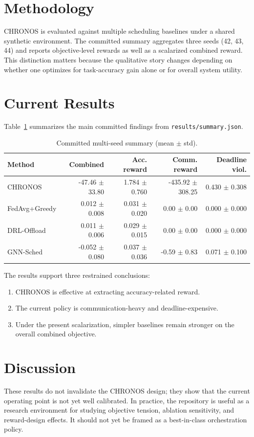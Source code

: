 \documentclass[conference]{IEEEtran}
\begin{document}
\section{Methodology}
CHRONOS is evaluated against multiple scheduling baselines under a shared synthetic environment. The committed summary aggregates three seeds (42, 43, 44) and reports objective-level rewards as well as a scalarized combined reward. This distinction matters because the qualitative story changes depending on whether one optimizes for task-accuracy gain alone or for overall system utility.

\section{Current Results}
Table~\ref{tab:results} summarizes the main committed findings from \texttt{results/summary.json}.

\begin{table}[h]
\centering
\caption{Committed multi-seed summary (mean $\pm$ std).}
\label{tab:results}
\begin{tabular}{lrrrr}
\toprule
Method & Combined & Acc. reward & Comm. reward & Deadline viol. \\
\midrule
CHRONOS & -47.46 $\pm$ 33.80 & 1.784 $\pm$ 0.760 & -435.92 $\pm$ 308.25 & 0.430 $\pm$ 0.308 \\
FedAvg+Greedy & 0.012 $\pm$ 0.008 & 0.031 $\pm$ 0.020 & 0.00 $\pm$ 0.00 & 0.000 $\pm$ 0.000 \\
DRL-Offload & 0.011 $\pm$ 0.006 & 0.029 $\pm$ 0.015 & 0.00 $\pm$ 0.00 & 0.000 $\pm$ 0.000 \\
GNN-Sched & -0.052 $\pm$ 0.080 & 0.037 $\pm$ 0.036 & -0.59 $\pm$ 0.83 & 0.071 $\pm$ 0.100 \\
\bottomrule
\end{tabular}
\end{table}

The results support three restrained conclusions:
\begin{enumerate}
\item CHRONOS is effective at extracting accuracy-related reward.
\item The current policy is communication-heavy and deadline-expensive.
\item Under the present scalarization, simpler baselines remain stronger on the overall combined objective.
\end{enumerate}

\section{Discussion}
These results do not invalidate the CHRONOS design; they show that the current operating point is not yet well calibrated. In practice, the repository is useful as a research environment for studying objective tension, ablation sensitivity, and reward-design effects. It should not yet be framed as a best-in-class orchestration policy.
\end{document}
